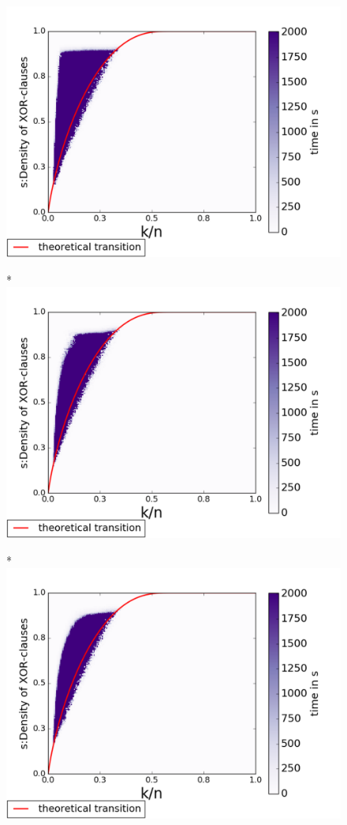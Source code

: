 \begin{figure}
	\begin{multicols}{3}
		\includegraphics[width=1\linewidth]{pb-experiments/runtime/adder/200.pdf}\par
		*{\adder}
		\includegraphics[width=1\linewidth]{pb-experiments/runtime/bdd/200.pdf}\par 
		*{\bdd}
		\includegraphics[width=1\linewidth]{pb-experiments/runtime/card/200.pdf}\par

\end{multicols}
\end{figure}
